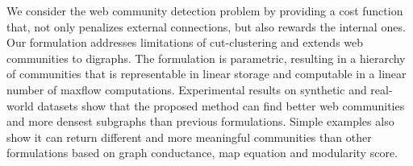 %
We consider the web community detection problem by providing a cost function that, not only penalizes external connections, but also rewards the internal ones. Our formulation addresses limitations of cut-clustering and extends web communities to digraphs.  The formulation is parametric, resulting in a hierarchy of communities that is representable in linear storage and computable in a linear number of maxflow computations.  Experimental results on synthetic and real-world datasets show that the proposed method can find better web communities and more densest subgraphs than previous formulations. Simple examples also show it can return different and more meaningful communities than other formulations based on graph conductance, map equation and modularity score.
